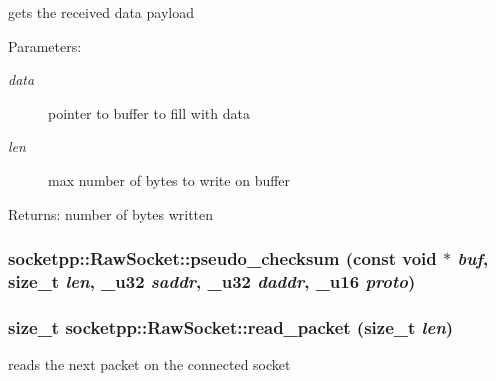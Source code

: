 gets the received data payload 

\begin{Desc}
\item[Parameters:]
\begin{description}
\item[{\em data}]pointer to buffer to fill with data \item[{\em len}]max number of bytes to write on buffer \end{description}
\end{Desc}
\begin{Desc}
\item[Returns:]number of bytes written \end{Desc}
\hypertarget{classsocketpp_1_1RawSocket_c9422942a0ed23c9900d26426a96a0ee}{
\subsubsection[{pseudo\_\-checksum}]{ socketpp::RawSocket::pseudo\_\-checksum (const void $\ast$ {\em buf}, \/  size\_\-t {\em len}, \/  {\bf \_\-u32} {\em saddr}, \/  {\bf \_\-u32} {\em daddr}, \/  {\bf \_\-u16} {\em proto})}}
\label{classsocketpp_1_1RawSocket_c9422942a0ed23c9900d26426a96a0ee}


\hypertarget{classsocketpp_1_1RawSocket_ea48bec4596e2afc89adba2ccb13f6c8}{
\subsubsection[{read\_\-packet}]{\setlength{\rightskip}{0pt plus 5cm}size\_\-t socketpp::RawSocket::read\_\-packet (size\_\-t {\em len})}}
\label{classsocketpp_1_1RawSocket_ea48bec4596e2afc89adba2ccb13f6c8}


reads the next packet on the connected socket 

